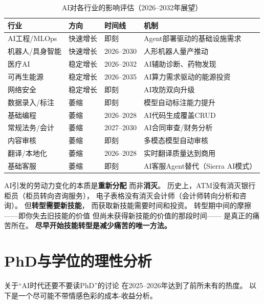 \begin{table}[htbp]
\centering
\caption{AI对各行业的影响评估（2026--2032年展望）}
\label{tab:sector-impact}
\small
\begin{tabularx}{\textwidth}{l l l X}
\toprule
\rowcolor{figLightGray}
\textbf{行业} & \textbf{方向} & \textbf{时间线} & \textbf{机制} \\
\midrule
AI工程/MLOps & 快速增长 & 即刻 & Agent部署驱动的基础设施需求 \\
机器人/具身智能 & 快速增长 & 2026--2030 & 人形机器人量产推动 \\
医疗AI & 稳定增长 & 2026--2032 & AI辅助诊断、药物发现 \\
可再生能源 & 稳定增长 & 2026--2035 & AI算力需求驱动的能源投资 \\
网络安全 & 稳定增长 & 即刻 & AI攻防双向升级 \\
\midrule
数据录入/标注 & 萎缩 & 即刻 & 模型自动标注能力提升 \\
基础编程 & 萎缩 & 2026--2028 & AI代码生成覆盖CRUD \\
常规法务/会计 & 萎缩 & 2027--2030 & AI合同审查/财务分析 \\
内容审核 & 萎缩 & 即刻 & 多模态模型自动审核 \\
翻译/本地化 & 萎缩 & 2026--2028 & 实时翻译质量达到商用 \\
基础客服 & 萎缩 & 即刻 & AI客服Agent替代（Sierra AI模式） \\
\bottomrule
\end{tabularx}
\end{table}

\begin{corebox}
AI引发的劳动力变化的本质是\textbf{重新分配}
而非\textbf{消灭}。
历史上，ATM没有消灭银行柜员（柜员转向咨询服务），
电子表格没有消灭会计师（会计师转向分析和咨询）。
但\textbf{转型需要新技能}，
而获取新技能需要时间和投资。
转型期中间的摩擦——即你失去旧技能的价值
但尚未获得新技能的价值的那段时间——
是真正的痛苦所在。
\textbf{尽早开始技能转型是减少痛苦的唯一方法。}
\end{corebox}


\section{PhD与学位的理性分析}
\label{sec:fg-phd}

关于``AI时代还要不要读PhD''的讨论
在2025--2026年达到了前所未有的热度。
以下是一个尽可能不带情感色彩的成本-收益分析。

